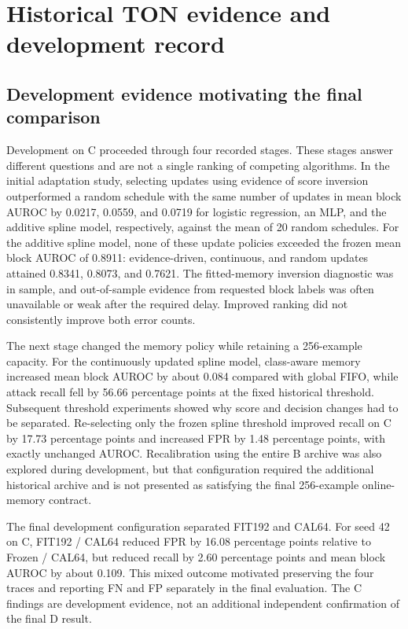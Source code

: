 \section{Historical TON evidence and development record}
\subsection{Development evidence motivating the final comparison}
Development on C proceeded through four recorded stages. These stages answer different questions and are not a single ranking of competing algorithms. In the initial adaptation study, selecting updates using evidence of score inversion outperformed a random schedule with the same number of updates in mean block AUROC by 0.0217, 0.0559, and 0.0719 for logistic regression, an MLP, and the additive spline model, respectively, against the mean of 20 random schedules. For the additive spline model, none of these update policies exceeded the frozen mean block AUROC of 0.8911: evidence-driven, continuous, and random updates attained 0.8341, 0.8073, and 0.7621. The fitted-memory inversion diagnostic was in sample, and out-of-sample evidence from requested block labels was often unavailable or weak after the required delay. Improved ranking did not consistently improve both error counts.

The next stage changed the memory policy while retaining a 256-example capacity. For the continuously updated spline model, class-aware memory increased mean block AUROC by about 0.084 compared with global FIFO, while attack recall fell by 56.66 percentage points at the fixed historical threshold. Subsequent threshold experiments showed why score and decision changes had to be separated. Re-selecting only the frozen spline threshold improved recall on C by 17.73 percentage points and increased FPR by 1.48 percentage points, with exactly unchanged AUROC. Recalibration using the entire B archive was also explored during development, but that configuration required the additional historical archive and is not presented as satisfying the final 256-example online-memory contract.

The final development configuration separated FIT192 and CAL64. For seed 42 on C, FIT192 / CAL64 reduced FPR by 16.08 percentage points relative to Frozen / CAL64, but reduced recall by 2.60 percentage points and mean block AUROC by about 0.109. This mixed outcome motivated preserving the four traces and reporting FN and FP separately in the final evaluation. The C findings are development evidence, not an additional independent confirmation of the final D result.

